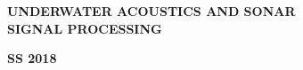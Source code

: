\begin{center}
%
\begin{figure}[H]
{\centering {}\par}
\end{figure}
\vspace{0.2cm}
\bfseries{UNDERWATER ACOUSTICS AND SONAR\\SIGNAL PROCESSING}\\
\vspace{1.1cm}
\begin{large}
\bfseries{ SS 2018}\\
\end{large}
\vspace{1.0cm}
\begin{figure}[H]
{\centering {}\par}
\end{figure}

\end{center}
